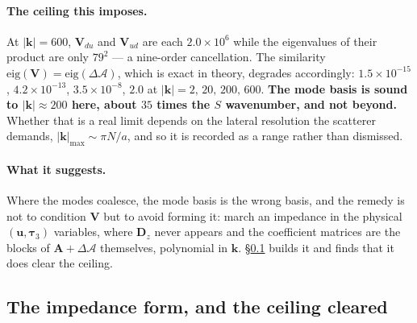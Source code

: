 \documentclass[11pt,a4paper]{article}
\newcommand{\bA}{\mathbf{A}}
\newcommand{\bV}{\mathbf{V}}
\newcommand{\bu}{\mathbf{u}}
\newcommand{\bta}{\boldsymbol{\tau}}
\newcommand{\dA}{\Delta\mathcal{A}}
\begin{document}
\paragraph{The ceiling this imposes.}  At $|\mathbf{k}| = 600$,
$\bV_{du}$ and $\bV_{ud}$ are each $2.0\times10^{6}$ while the eigenvalues of
their product are only $79^2$ --- a nine-order cancellation.  The similarity
$\mathrm{eig}(\bV) = \mathrm{eig}(\dA)$, which is exact in theory, degrades
accordingly: $1.5\times10^{-15}$, $4.2\times10^{-13}$, $3.5\times10^{-8}$,
$2.0$ at $|\mathbf{k}| = 2,\,20,\,200,\,600$.  \textbf{The mode basis is sound to
$|\mathbf{k}|\approx200$ here, about $35$ times the $S$ wavenumber, and not
beyond.}  Whether that is a real limit depends on the lateral resolution the
scatterer demands, $|\mathbf{k}|_{\max}\sim\pi N/a$, and so it is recorded as a
range rather than dismissed.

\paragraph{What it suggests.}  Where the modes coalesce, the mode basis is the
wrong basis, and the remedy is not to condition $\bV$ but to avoid forming it:
march an impedance in the physical $(\bu,\bta_3)$ variables, where
$\mathbf{D}_z$ never appears and the coefficient matrices are the blocks of
$\bA + \dA$ themselves, polynomial in $\mathbf{k}$.  \S\ref{sec:impedance}
builds it and finds that it does clear the ceiling.

\subsection{The impedance form, and the ceiling cleared}\label{sec:impedance}
\end{document}
